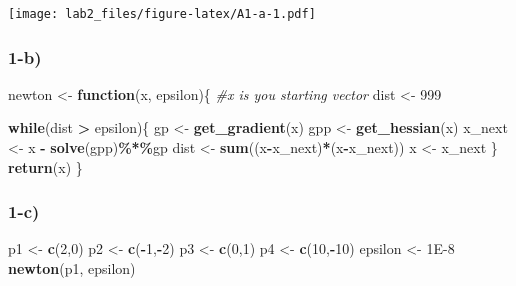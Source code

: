 \documentclass[
]{article}
\newenvironment{Shaded}{\begin{snugshade}}{\end{snugshade}}
\newcommand{\CommentTok}[1]{\textcolor[rgb]{0.56,0.35,0.01}{\textit{#1}}}
\newcommand{\ControlFlowTok}[1]{\textcolor[rgb]{0.13,0.29,0.53}{\textbf{#1}}}
\newcommand{\DecValTok}[1]{\textcolor[rgb]{0.00,0.00,0.81}{#1}}
\newcommand{\FloatTok}[1]{\textcolor[rgb]{0.00,0.00,0.81}{#1}}
\newcommand{\FunctionTok}[1]{\textcolor[rgb]{0.13,0.29,0.53}{\textbf{#1}}}
\newcommand{\NormalTok}[1]{#1}
\newcommand{\OtherTok}[1]{\textcolor[rgb]{0.56,0.35,0.01}{#1}}
\newcommand{\SpecialCharTok}[1]{\textcolor[rgb]{0.81,0.36,0.00}{\textbf{#1}}}
\begin{document}
\texttt{[image: lab2\_files/figure-latex/A1-a-1.pdf]}

\hypertarget{b-2}{%
\subsubsection{1-b)}\label{b-2}}

\begin{Shaded}
\begin{Highlighting}[]
\NormalTok{newton }\OtherTok{\textless{}{-}} \ControlFlowTok{function}\NormalTok{(x, epsilon)\{}
  \CommentTok{\#x is you starting vector}
\NormalTok{  dist }\OtherTok{\textless{}{-}} \DecValTok{999}
  
  \ControlFlowTok{while}\NormalTok{(dist }\SpecialCharTok{\textgreater{}}\NormalTok{ epsilon)\{}
\NormalTok{    gp }\OtherTok{\textless{}{-}} \FunctionTok{get\_gradient}\NormalTok{(x)}
\NormalTok{    gpp }\OtherTok{\textless{}{-}} \FunctionTok{get\_hessian}\NormalTok{(x)}
\NormalTok{    x\_next }\OtherTok{\textless{}{-}}\NormalTok{ x }\SpecialCharTok{{-}} \FunctionTok{solve}\NormalTok{(gpp)}\SpecialCharTok{\%*\%}\NormalTok{gp}
\NormalTok{    dist }\OtherTok{\textless{}{-}} \FunctionTok{sum}\NormalTok{((x}\SpecialCharTok{{-}}\NormalTok{x\_next)}\SpecialCharTok{*}\NormalTok{(x}\SpecialCharTok{{-}}\NormalTok{x\_next))}
\NormalTok{    x }\OtherTok{\textless{}{-}}\NormalTok{ x\_next}
\NormalTok{  \}}
  \FunctionTok{return}\NormalTok{(x)}
\NormalTok{\}}
\end{Highlighting}
\end{Shaded}

\hypertarget{c-2}{%
\subsubsection{1-c)}\label{c-2}}

\begin{Shaded}
\begin{Highlighting}[]
\NormalTok{p1 }\OtherTok{\textless{}{-}} \FunctionTok{c}\NormalTok{(}\DecValTok{2}\NormalTok{,}\DecValTok{0}\NormalTok{)}
\NormalTok{p2 }\OtherTok{\textless{}{-}} \FunctionTok{c}\NormalTok{(}\SpecialCharTok{{-}}\DecValTok{1}\NormalTok{,}\SpecialCharTok{{-}}\DecValTok{2}\NormalTok{)}
\NormalTok{p3 }\OtherTok{\textless{}{-}} \FunctionTok{c}\NormalTok{(}\DecValTok{0}\NormalTok{,}\DecValTok{1}\NormalTok{)}
\NormalTok{p4 }\OtherTok{\textless{}{-}} \FunctionTok{c}\NormalTok{(}\DecValTok{10}\NormalTok{,}\SpecialCharTok{{-}}\DecValTok{10}\NormalTok{)}
\NormalTok{epsilon }\OtherTok{\textless{}{-}} \FloatTok{1E{-}8}
\FunctionTok{newton}\NormalTok{(p1, epsilon)}
\end{Highlighting}
\end{Shaded}
\end{document}
